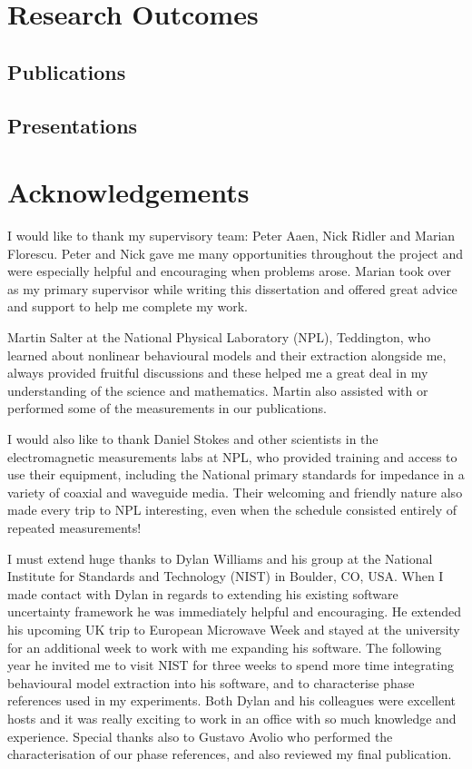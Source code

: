 \documentclass[../thesis/thesis.tex]{subfiles}
\begin{document}
\chapter*{Research Outcomes}
\begin{refsection}
\section*{Publications}
\nocite{Votsi_2020, Salter_2018, Stant_2018_TMTT, Stant_2017, Stant_2016}
\printbibliography[heading=none]
\end{refsection}
\begin{refsection}
\section*{Presentations}
\nocite{Stant_2017_pgi, Stant_2017_feps, Stant_2016_pg, Stant_2016_Coll}
\printbibliography[heading=none]
\end{refsection}
\chapter*{Acknowledgements}
I would like to thank my supervisory team: Peter Aaen, Nick Ridler and Marian Florescu. Peter and Nick gave me many opportunities throughout the project and were especially helpful and encouraging when problems arose. Marian took over as my primary supervisor while writing this dissertation and offered great advice and support to help me complete my work.

Martin Salter at the National Physical Laboratory (NPL), Teddington, who learned about nonlinear behavioural models and their extraction alongside me, always provided fruitful discussions and these helped me a great deal in my understanding of the science and mathematics. Martin also assisted with or performed some of the measurements in our publications.

I would also like to thank Daniel Stokes and other scientists in the electromagnetic measurements labs at NPL, who provided training and access to use their equipment, including the National primary standards for impedance in a variety of coaxial and waveguide media. Their welcoming and friendly nature also made every trip to NPL interesting, even when the schedule consisted entirely of repeated measurements!

I must extend huge thanks to Dylan Williams and his group at the National Institute for Standards and Technology (NIST) in Boulder, CO, USA. When I made contact with Dylan in regards to extending his existing software uncertainty framework he was immediately helpful and encouraging. He extended his upcoming UK trip to European Microwave Week and stayed at the university for an additional week to work with me expanding his software. The following year he invited me to visit NIST for three weeks to spend more time integrating behavioural model extraction into his software, and to characterise phase references used in my experiments. Both Dylan and his colleagues were excellent hosts and it was really exciting to work in an office with so much knowledge and experience. Special thanks also to Gustavo Avolio who performed the characterisation of our phase references, and also reviewed my final publication.
\end{document}
